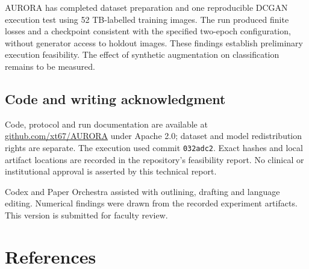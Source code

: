 \documentclass[
]{article}
\begin{document}
AURORA has completed dataset preparation and one reproducible DCGAN
execution test using 52 TB-labelled training images. The run produced
finite losses and a checkpoint consistent with the specified two-epoch
configuration, without generator access to holdout images. These
findings establish preliminary execution feasibility. The effect of
synthetic augmentation on classification remains to be measured.

\subsection{Code and writing
acknowledgment}\label{code-and-writing-acknowledgment}

Code, protocol and run documentation are available at
\href{https://github.com/xt67/AURORA}{github.com/xt67/AURORA} under
Apache 2.0; dataset and model redistribution rights are separate. The
execution used commit \texttt{032adc2}. Exact hashes and local artifact
locations are recorded in the repository's feasibility report. No
clinical or institutional approval is asserted by this technical report.

Codex and Paper Orchestra assisted with outlining, drafting and language
editing. Numerical findings were drawn from the recorded experiment
artifacts. This version is submitted for faculty review.

\section*{References}\label{bibliography}
\end{document}
